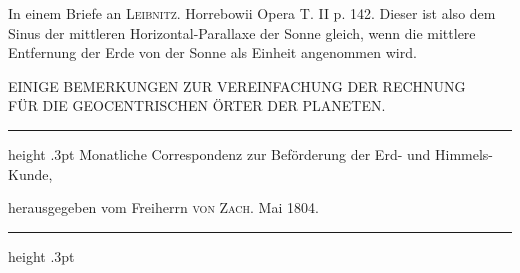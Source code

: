 \expandafter\def\csname HistoricalNoteText4\endcsname{In einem Briefe an \textsc{Leibnitz}. Horrebowii Opera T. II p. 142.}
\expandafter\def\csname HistoricalNoteText5\endcsname{Dieser ist also dem Sinus der mittleren Horizontal-Parallaxe der Sonne gleich, wenn die mittlere
Entfernung der Erde von der Sonne als Einheit angenommen wird.}
\clearpage
\begingroup
\pagestyle{empty}
\thispagestyle{empty}
\noindent{}%
\par\vspace*{9mm}
\begin{center}\normalsize EINIGE BEMERKUNGEN ZUR VEREINFACHUNG DER RECHNUNG\\FÜR DIE GEOCENTRISCHEN ÖRTER DER PLANETEN.\end{center}
\begin{center}\parbox{.78\linewidth}{\centering\fontsize{8.6}{10.5}\selectfont\frenchspacing
\hrule height .3pt\relax\vspace{2.5pt}
Monatliche Correspondenz zur Beförderung der Erd- und Himmels-Kunde,\par
herausgegeben vom Freiherrn \textsc{von Zach}. Mai 1804.\par
\vspace{2.5pt}\hrule height .3pt\relax
}\end{center}

